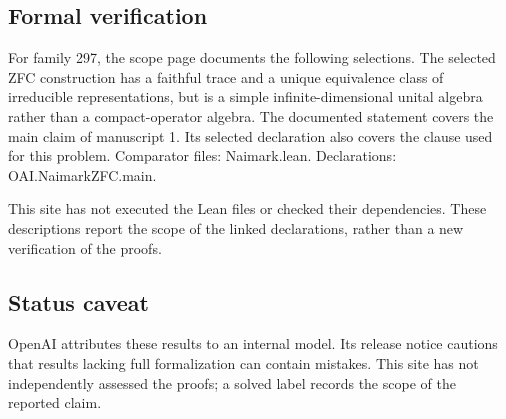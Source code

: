 \documentclass[11pt]{article}
\begin{document}
\subsection{Formal verification}
For family 297, the scope page documents the following selections. The selected ZFC construction has a faithful trace and a unique equivalence class of irreducible representations, but is a simple infinite-dimensional unital algebra rather than a compact-operator algebra. The documented statement covers the main claim of manuscript 1. Its selected declaration also covers the clause used for this problem. Comparator files: Naimark.lean. Declarations: OAI.NaimarkZFC.main.

This site has not executed the Lean files or checked their dependencies. These descriptions report the scope of the linked declarations, rather than a new verification of the proofs.

\subsection{Status caveat}
OpenAI attributes these results to an internal model. Its release notice cautions that results lacking full formalization can contain mistakes. This site has not independently assessed the proofs; a solved label records the scope of the reported claim.
\end{document}
